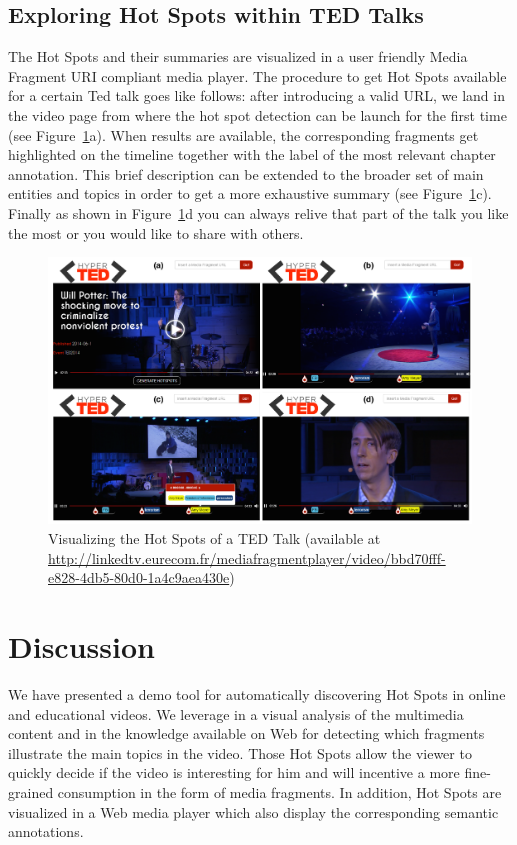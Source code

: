 \documentclass{llncs}
\begin{document}
\subsection{Exploring Hot Spots within TED Talks}
\label{sec:usecase}
The Hot Spots and their summaries are visualized in a user friendly Media Fragment URI compliant media player. The procedure to get Hot Spots available for a certain Ted talk goes like follows: after introducing a valid URL, we land in the video page from where the hot spot detection can be launch for the first time (see Figure~\ref{fig:demoScreenShots}a). When results are available, the corresponding fragments get highlighted on the timeline together with the label of the most relevant chapter annotation. This brief description can be extended to the broader set of main entities and topics in order to get a more exhaustive summary (see Figure~\ref{fig:demoScreenShots}c). Finally as shown in Figure~\ref{fig:demoScreenShots}d you can always relive that part of the talk you like the most or you would like to share with others.

\begin{figure}[h!]
\centering
\includegraphics[width=1\textwidth]{figure/Ted_U}
\caption{Visualizing the Hot Spots of a TED Talk (available at \fontsize{8pt}{1em}\selectfont \protect\url{http://linkedtv.eurecom.fr/mediafragmentplayer/video/bbd70fff-e828-4db5-80d0-1a4c9aea430e})}
\label{fig:demoScreenShots}%
\end{figure}


\section{Discussion}
\label{sec:discussion}
We have presented a demo tool for automatically discovering Hot Spots in online and educational videos. We leverage in a visual analysis of the multimedia content and in the knowledge available on Web for detecting which fragments illustrate the main topics in the video. Those Hot Spots allow the viewer to quickly decide if the video is interesting for him and will incentive a more fine-grained consumption in the form of media fragments. In addition, Hot Spots are visualized in a Web media player which also display the corresponding semantic annotations.
\end{document}
